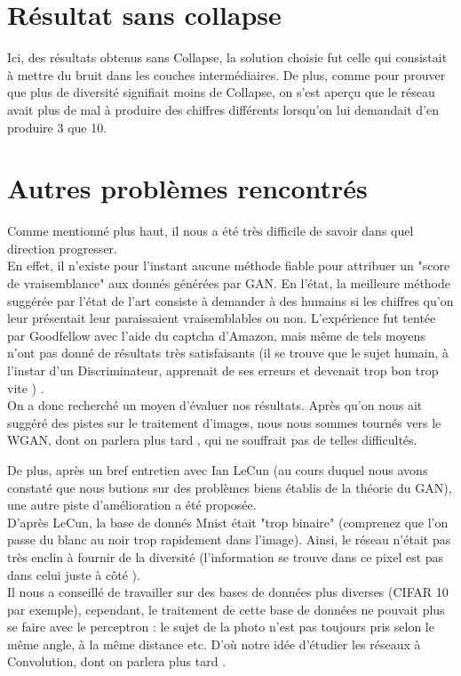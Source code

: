 	



\section{Résultat sans collapse}
Ici, des résultats obtenus sans Collapse, la solution choisie fut celle qui consistait à mettre du bruit dans les couches intermédiaires. De plus, comme pour prouver que plus de diversité signifiait moins de Collapse, on s'est aperçu que le réseau avait plus de mal à produire des chiffres différents lorsqu'on lui demandait d'en produire 3 que 10.


\section{Autres problèmes rencontrés } 
Comme mentionné plus haut, il nous a été très difficile de savoir dans quel direction progresser.\\
En effet, il n'existe pour l'instant aucune méthode fiable pour attribuer un "score de vraisemblance"  aux donnés générées par GAN. En l'état, la meilleure méthode suggérée par l'état de l'art consiste à demander à des humains si les chiffres qu'on leur présentait leur paraissaient vraisemblables ou non. L'expérience fut tentée par Goodfellow avec l'aide du captcha d'Amazon, mais même de tels moyens n'ont pas donné de résultats très satisfaisants (il se trouve que le sujet humain, à l'instar d'un Discriminateur, apprenait de ses erreurs et devenait trop bon trop vite ) . \\
On a donc recherché un moyen d'évaluer nos résultats. Après qu'on nous ait suggéré des pistes sur le traitement d'images, nous nous sommes tournés vers le WGAN, dont on parlera plus tard , qui ne souffrait pas de telles difficultés. 

De plus, après un bref entretien avec Ian LeCun (au cours duquel nous avons constaté que nous butions sur des problèmes biens établis de la théorie du GAN), une autre piste d'amélioration a été proposée. \\
D'après LeCun, la base de donnés Mnist était "trop binaire" (comprenez que l'on passe du blanc au noir trop rapidement dans l'image). Ainsi, le réseau n'était pas très enclin à fournir de la diversité (l'information se trouve dans ce pixel est pas dans celui juste à côté ). \\
Il nous  a conseillé de travailler sur des bases de données plus diverses (CIFAR 10 par exemple), cependant, le traitement de cette base de données ne pouvait plus se faire avec le perceptron : le sujet de la photo n'est pas toujours pris selon le même angle, à la même distance etc. D'où notre idée d'étudier les réseaux à Convolution, dont on parlera plus tard . \\

